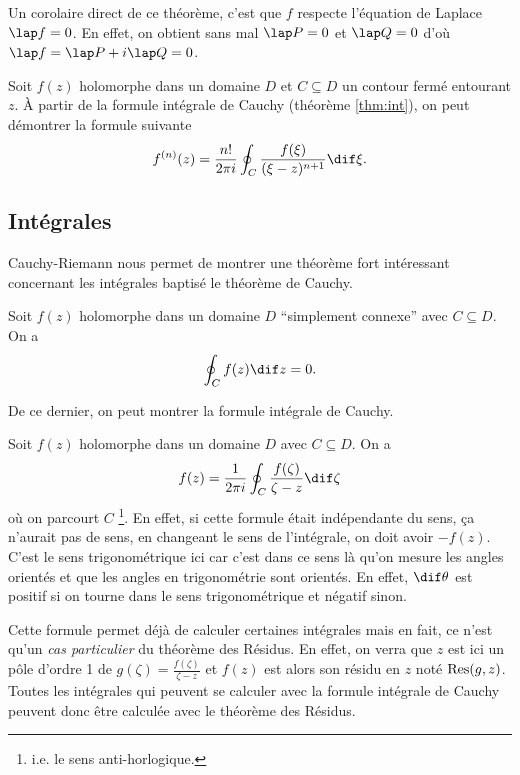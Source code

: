 Un corolaire direct de ce théorème, c'est que $f$ respecte l'équation
de Laplace $\lap f = 0$.
En effet, on obtient sans mal $\lap P = 0$ et $\lap Q = 0$ d'où
$\lap f = \lap P + i\lap Q = 0$.

\begin{mytheo}
	Soit $f(z)$ holomorphe dans un domaine $D$
    et $C \subseteq D$ un contour fermé entourant $z$.
    À partir de la formule intégrale 
	de Cauchy (théorème \ref{thm:int}),
	on peut démontrer la formule suivante
	\[ f^{(n)}(z) = \frac{n!}{2\pi i}\oint_C 
	\frac{f(\xi)}{(\xi-z)^{n+1}}\dif \xi.\] 
\end{mytheo}

\subsection{Intégrales}
Cauchy-Riemann nous permet de montrer
une théorème fort intéressant concernant les intégrales baptisé le
théorème de Cauchy.
\begin{mytheo}
  Soit $f(z)$ holomorphe dans un domaine $D$ ``simplement connexe''
  avec $C \subseteq D$.
  On a
  \[ \oint_C f(z) \dif z = 0. \]
\end{mytheo}
De ce dernier, on peut montrer la formule intégrale de Cauchy.
\begin{mytheo}
  \label{thm:int}
  Soit $f(z)$ holomorphe dans un domaine $D$
  avec $C \subseteq D$. %
  On a 
  \[ f(z) = \frac{1}{2\pi i}\oint_C
  \frac{f(\zeta)}{\zeta-z} \dif \zeta \]
  où on parcourt $C$ 
  \footnote{i.e. le sens anti-horlogique.}.
  En effet, si cette formule était indépendante du sens,
  ça n'aurait pas de sens,
  en changeant le sens de l'intégrale,
  on doit avoir $-f(z)$.
  C'est le sens trigonométrique ici car c'est dans ce sens
  là qu'on mesure les angles orientés et que les angles en trigonométrie
  sont orientés.
  En effet, $\dif \theta$ est positif si on tourne dans le sens
  trigonométrique et négatif sinon.
\end{mytheo}

Cette formule permet déjà de calculer certaines intégrales mais
en fait, ce n'est qu'un \emph{cas particulier} du théorème des Résidus.
En effet, on verra que $z$ est ici un pôle d'ordre 1 de
$g(\zeta)=\frac{f(\zeta)}{\zeta-z}$
et $f(z)$ est alors son résidu en $z$ noté
$\operatorname{Res}(g,z)$.
Toutes les intégrales qui peuvent se calculer avec la formule
intégrale de Cauchy peuvent donc être calculée avec le théorème
des Résidus.

